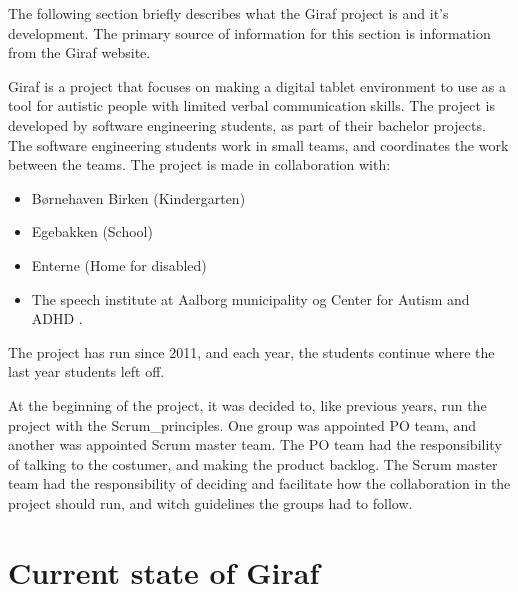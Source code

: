 
The following section briefly describes what the Giraf project is and it's development. The primary source of information for this section is information from the Giraf website\cite{GirafWebsite}.


\par \noindent
Giraf is a project that focuses on making a digital tablet environment to use as a tool for autistic people with limited verbal communication skills. The project is developed by software engineering students, as part of their bachelor projects.  The software engineering students work in small teams, and coordinates the work between the teams. The project is made in collaboration with:
\begin{itemize}
    \item Børnehaven Birken (Kindergarten) \cite{bhBirken} 
    \item Egebakken (School) \cite{egebakken} 
    \item Enterne (Home for disabled) \cite{enterne}
    \item The speech institute at Aalborg municipality og Center for Autism and ADHD \cite{center_for_autism}.     
\end{itemize} 
The project has run since 2011, and each year, the students continue where the last year students left off. \newline 

\par \noindent
At the beginning of the project, it was decided to, like previous years, run the project with the \gls{Scrum_principles}. One group was appointed \gls{PO} team, and another was appointed Scrum master team. The \gls{PO} team had the responsibility of talking to the costumer, and making the product backlog. The Scrum master team had the responsibility of deciding  and facilitate how the collaboration in the project should run, and witch guidelines the groups had to follow. 

\section{Current state of Giraf}

